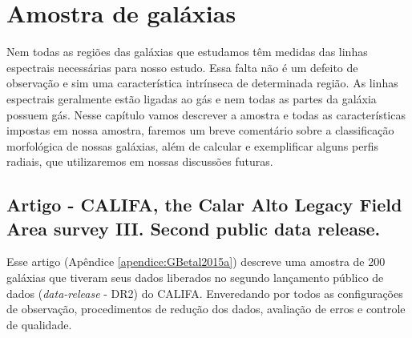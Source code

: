 


\chapter{Amostra de galáxias}
\label{sec:amostra}

Nem todas as regiões das galáxias que estudamos têm medidas das linhas espectrais necessárias para
nosso estudo. Essa falta não é um defeito de observação e sim uma característica intrínseca de
determinada região. As linhas espectrais geralmente estão ligadas ao gás e nem todas as partes da
galáxia possuem gás. Nesse capítulo vamos descrever a amostra e todas as características impostas em
nossa amostra, faremos um breve comentário sobre a classificação morfológica de nossas galáxias,
além de calcular e exemplificar alguns perfis radiais, que utilizaremos em nossas discussões
futuras.

\section{Artigo - CALIFA, the Calar Alto Legacy Field Area survey III. Second public data
release.}

Esse artigo (Apêndice \ref{apendice:GBetal2015a}) descreve uma amostra de 200 galáxias que tiveram
seus dados liberados no segundo lançamento público de dados ({\em data-release} - DR2) do CALIFA.
Enveredando por todos as configurações de observação, procedimentos de redução dos dados, avaliação
de erros e controle de qualidade. 


